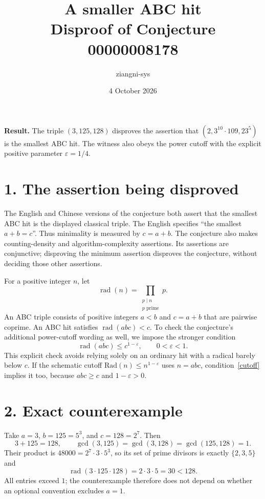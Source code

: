 \documentclass[11pt,a4paper]{article}
\title{A smaller ABC hit\\Disproof of Conjecture 00000008178}
\author{ziangni-sys}
\date{4 October 2026}
\newcommand{\rad}{\operatorname{rad}}
\begin{document}
\maketitle

\textbf{Result.} The triple $(3,125,128)$ disproves the assertion that
$(2,3^{10}\cdot109,23^5)$ is the smallest ABC hit. The witness also obeys
the power cutoff with the explicit positive parameter $\varepsilon=1/4$.

\section*{1. The assertion being disproved}
The English and Chinese versions of the conjecture both assert that the
smallest ABC hit is the displayed classical triple. The English specifies
``the smallest $a+b=c$''. Thus minimality is measured by $c=a+b$.
The conjecture also makes counting-density and algorithm-complexity
assertions. Its assertions are conjunctive; disproving the minimum assertion
disproves the conjecture, without deciding those other assertions.

For a positive integer $n$, let
\[
  \rad(n)=\prod_{\substack{p\mid n\\p\text{ prime}}}p.
\]
An ABC triple consists of positive integers $a<b$ and $c=a+b$ that are
pairwise coprime. An ABC hit satisfies $\rad(abc)<c$. To check the
conjecture's additional power-cutoff wording as well, we impose the
stronger condition
\begin{equation}\label{cutoff}
  \rad(abc)\leq c^{1-\varepsilon},\qquad 0<\varepsilon<1.
\end{equation}
This explicit check avoids relying solely on an ordinary hit with a
radical barely below $c$. If the schematic cutoff $\mathrm{Rad}(n)\leq
n^{1-\varepsilon}$ uses $n=abc$, condition~\eqref{cutoff} implies it too,
because $abc\geq c$ and $1-\varepsilon>0$.

\section*{2. Exact counterexample}
Take $a=3$, $b=125=5^3$, and $c=128=2^7$. Then
\[
  3+125=128,\qquad
  \gcd(3,125)=\gcd(3,128)=\gcd(125,128)=1.
\]
Their product is $48000=2^7\cdot3\cdot5^3$, so its set of prime
divisors is exactly $\{2,3,5\}$ and
\[
  \rad(3\cdot125\cdot128)=2\cdot3\cdot5=30<128.
\]
All entries exceed $1$; the counterexample therefore does not depend on
whether an optional convention excludes $a=1$.
\end{document}
